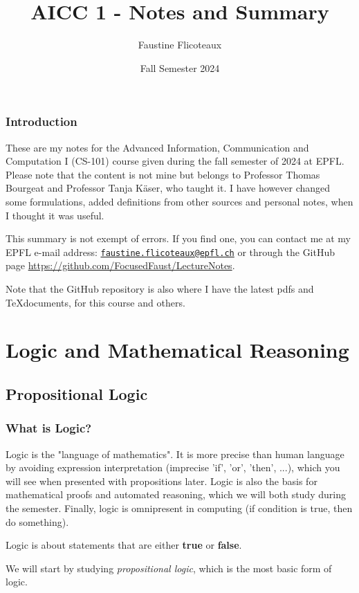 \documentclass[10pt,a4paper]{book}
\title{AICC 1 - Notes and Summary}
\author{Faustine Flicoteaux}
\date{Fall Semester 2024}
\begin{document}
\maketitle
\tableofcontents
\newpage


\section*{Introduction}
These are my notes for the Advanced Information, Communication and Computation I (CS-101) course given during the fall semester of 2024 at EPFL. Please note that the content is not mine but belongs to Professor Thomas Bourgeat and Professor Tanja Käser, who taught it. I have however changed some formulations, added definitions from other sources and personal notes, when I thought it was useful.\par
This summary is not exempt of errors. If you find one, you can contact me at my EPFL e-mail address: \texttt{\href{mailto:faustine.flicoteaux@epfl.ch}{faustine.flicoteaux@epfl.ch}} or through the GitHub page \url{https://github.com/FocusedFaust/LectureNotes}.\par 
Note that the GitHub repository is also where I have the latest pdfs and \TeX documents, for this course and others.

\part{Logic and Mathematical Reasoning}

\chapter{Propositional Logic}
\section{What is Logic?}
Logic is the "language of mathematics". It is more precise than human language by avoiding expression interpretation (imprecise 'if', 'or', 'then', ...), which you will see when presented with propositions later. Logic is also the basis for mathematical proofs and automated reasoning, which we will both study during the semester. Finally, logic is omnipresent in computing (if condition is true, then do something).\par 
Logic is about statements that are either \textbf{true} or \textbf{false}. \par 
We will start by studying \textit{propositional logic}, which is the most basic form of logic.
\end{document}
